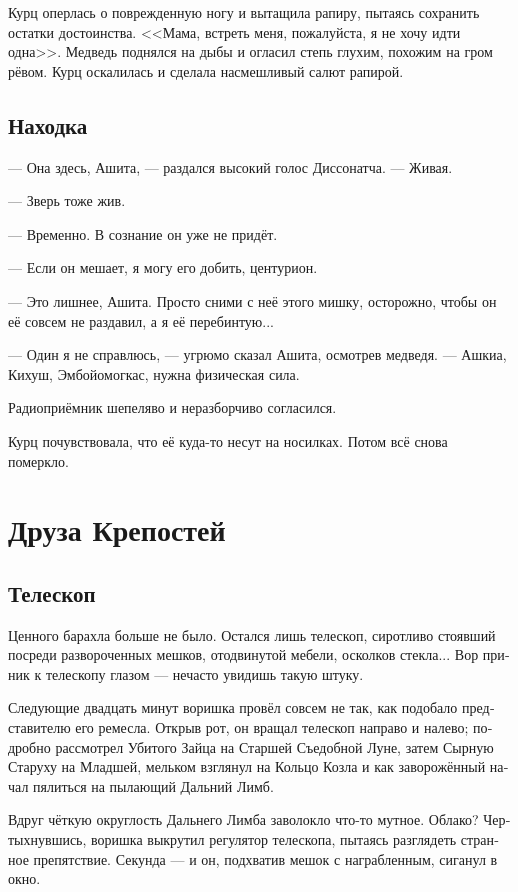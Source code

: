 \documentclass[a4paper,12pt,fleqn]{book}\usepackage{polyglossia}\setdefaultlanguage[babelshorthands=true]{russian}\setotherlanguage{english}\defaultfontfeatures{Ligatures=TeX,Mapping=tex-text}\usepackage{xcolor}\newcommand{\ml}[3]{#2}
\begin{document}
Курц оперлась о поврежденную ногу и вытащила рапиру, пытаясь сохранить остатки достоинства.
<<Мама, встреть меня, пожалуйста, я не хочу идти одна>>.
Медведь поднялся на дыбы и огласил степь глухим, похожим на гром рёвом.
Курц оскалилась и сделала насмешливый салют рапирой.

\section{Находка}

--- Она здесь, Ашита, --- раздался высокий голос Диссонатча.
--- Живая.

--- Зверь тоже жив.

--- Временно.
В сознание он уже не придёт.

--- Если он мешает, я могу его добить, центурион.

--- Это лишнее, Ашита.
Просто сними с неё этого мишку, осторожно, чтобы он её совсем не раздавил, а я её перебинтую...

--- Один я не справлюсь, --- угрюмо сказал Ашита, осмотрев медведя.
--- Ашкиа, Кихуш, Эмбойомогкас, нужна физическая сила. %

Радиоприёмник шепеляво и неразборчиво согласился.

Курц почувствовала, что её куда-то несут на носилках.
Потом всё снова померкло.

\chapter{Друза Крепостей}

\section{Телескоп}

Ценного барахла больше не было.
Остался лишь телескоп, сиротливо стоявший посреди развороченных мешков, отодвинутой мебели, осколков стекла...
Вор приник к телескопу глазом --- нечасто увидишь такую штуку.

Следующие двадцать минут воришка провёл совсем не так, как подобало представителю его ремесла.
Открыв рот, он вращал телескоп направо и налево;
подробно рассмотрел Убитого Зайца на Старшей Съедобной Луне, затем Сырную Старуху на Младшей, мельком взглянул на Кольцо Козла и как заворожённый начал пялиться на пылающий Дальний Лимб.

Вдруг чёткую округлость Дальнего Лимба заволокло что-то мутное.
Облако?
Чертыхнувшись, воришка выкрутил регулятор телескопа, пытаясь разглядеть странное препятствие.
Секунда --- и он, подхватив мешок с награбленным, сиганул в окно.
\end{document}
